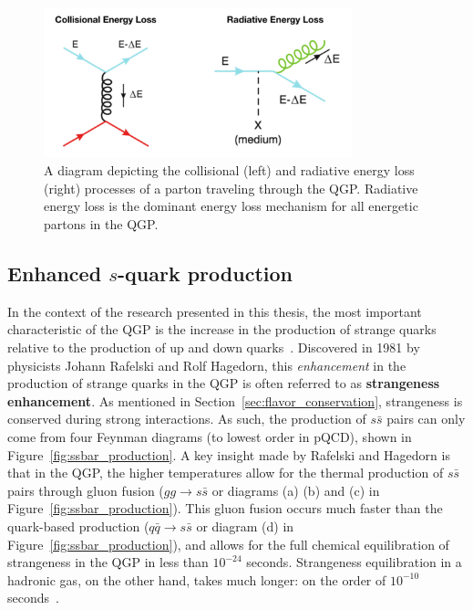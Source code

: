 \begin{figure}
    \centering
    \includegraphics[width=0.8\textwidth]{figures/introduction/energy_loss.png}
    \caption{A diagram depicting the collisional (left) and radiative energy loss (right) processes of a parton traveling through the QGP. Radiative energy loss is the dominant energy loss mechanism for all energetic partons in the QGP.}
    \label{fig:energy_loss_qgp}
\end{figure}


\subsection{Enhanced $s$-quark production}
\label{sec:qgp_strangeness}

In the context of the research presented in this thesis, the most important characteristic of the QGP is the increase in the production of strange quarks relative to the production of up and down quarks~\cite{Strangeness}. Discovered in 1981 by physicists Johann Rafelski and Rolf Hagedorn, this \textit{enhancement} in the production of strange quarks in the QGP is often referred to as \textbf{strangeness enhancement}. As mentioned in Section~\ref{sec:flavor_conservation}, strangeness is conserved during strong interactions. As such, the production of $s\bar{s}$ pairs can only come from four Feynman diagrams (to lowest order in pQCD), shown in Figure~\ref{fig:ssbar_production}. A key insight made by Rafelski and Hagedorn is that in the QGP, the higher temperatures allow for the thermal production of $s\bar{s}$ pairs through gluon fusion ($gg \rightarrow s\bar{s}$ or diagrams (a) (b) and (c) in Figure~\ref{fig:ssbar_production}). This gluon fusion occurs much faster than the quark-based production ($q\bar{q} \rightarrow s\bar{s}$ or diagram (d) in Figure~\ref{fig:ssbar_production}), and allows for the full chemical equilibration of strangeness in the QGP in less than $10^{-24}$ seconds. Strangeness equilibration in a hadronic gas, on the other hand, takes much longer: on the order of $10^{-10}$ seconds~\cite{Strangeness}.

